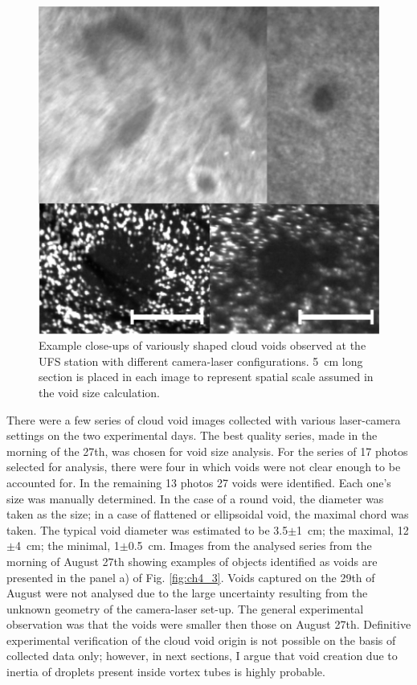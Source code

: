 \documentclass[../main.tex]{subfiles}
\begin{document}
\begin{figure}[h]
\centering
\noindent\includegraphics[width=35pc]{gfx/closeups.png}
\caption{Example close-ups of variously shaped cloud voids observed at the UFS station with different camera-laser configurations. 5~cm long section is placed in each image to represent spatial scale assumed in the void size calculation.}
\label{fig:ch4_4}
\end{figure}

There were a few series of cloud void images collected with various laser-camera settings on the two experimental days. The best quality series, made in the morning of the 27th, was chosen for void size analysis. For the series of 17 photos selected for analysis, there were four in which voids were not clear enough to be accounted for. In the remaining 13 photos 27 voids were identified. Each one's size was manually determined. In the case of a round void, the diameter was taken as the size; in a case of flattened or ellipsoidal void, the maximal chord was taken. The typical void diameter was estimated to be 3.5$\pm$1~cm; the maximal, 12$\pm$4~cm; the minimal, 1$\pm$0.5~cm. Images from the analysed series from the morning of August 27th showing examples of objects identified as voids are presented in the panel a) of Fig. \ref{fig:ch4_3}. Voids captured on the 29th of August were not analysed due to the large uncertainty resulting from the unknown geometry of the camera-laser set-up. The general experimental observation was that the voids were smaller then those on August 27th. Definitive experimental verification of the cloud void origin is not possible on the basis of collected data only; however, in next sections, I argue that void creation due to inertia of droplets present inside vortex tubes is highly probable.
\end{document}

